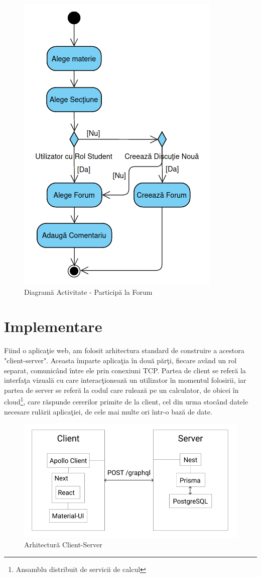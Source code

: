 \documentclass[12pt, a4paper, oneside, romanian]{teza-upb}
\begin{document}
\begin{figure}[H]
\centering
\includegraphics*[width=0.5\columnwidth]{diagrama-activitate-participa-la-forum}
\caption{Diagramă Activitate - Participă la Forum}
\label{diagrama-activitate-participa-la-forum}
\end{figure}

\chapter{Implementare}

Fiind o aplicaţie web, am folosit arhitectura standard de construire a acestora "client-server". Aceasta împarte aplicaţia în două părţi, fiecare având un rol separat, comunicând între ele prin conexiuni TCP. Partea de client se referă la interfaţa vizuală cu care interacţionează un utilizator în momentul folosirii, iar partea de server se referă la codul care rulează pe un calculator, de obicei în cloud\footnote{Ansamblu distribuit de servicii de calcul}, care răspunde cererilor primite de la client, cel din urma stocând datele necesare rulării aplicaţiei, de cele mai multe ori într-o bază de date.\cite{arhitecturaclientserver}

\begin{figure}[H]
\centering
\includegraphics*[width=0.7\columnwidth]{arhitectura-client-server}
\caption{Arhitectură Client-Server}
\label{arhitectura-client-server}
\end{figure}
\end{document}
